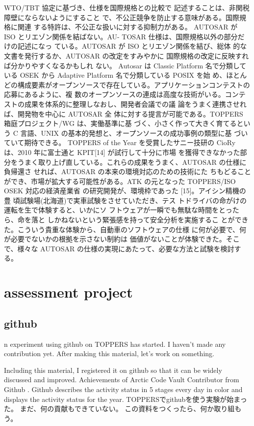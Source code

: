 \documentclass[twocolumn]{article} %
\begin{document}
WTO/TBT 協定に基づき、仕様を国際規格との比較で 記述することは、非関税障壁にならないようにすること で、不公正競争を防止する意味がある。国際規格に関連 する特許は、不公正な扱いに対する抑制力がある。
AUTOSAR が ISO とリエゾン関係を結ばない。AU- TOSAR 仕様は、国際規格以外の部分だけの記述になっ ている。AUTOSAR が ISO とリエゾン関係を結び、総体 的な文書を発行するか、AUTOSAR の改定をすみやかに 国際規格の改定に反映すれば分かりやすくなるかもしれ ない。
Autosar は Classic Platform 名で分類している OSEK から Adaptive Platform 名で分類している POSIX を始 め、ほとんどの構成要素がオープンソースで存在している。アプリケーションコンテストの応募にあるように、複 数のオープンソースの連成は高度な技術がいる。コンテ ストの成果を体系的に整理しなおし、開発者会議での議 論をうまく連携させれば、開発物を中心に AUTOSAR 全 体に対する提言が可能である。TOPPERS 箱庭プロジェクト/WG は、実働基準に基 づく、小さく作って大きく育てるという C 言語、UNIX の基本的発想と、オープンソースの成功事例の類型に基 づいていて期待できる。
TOPPERS of the Year を受賞したサニー技研の CioRy は、2010 年に富士通と KPIT[14] が試行して十分に市場 を獲得できなかった部分をうまく取り上げ直している。これらの成果をうまく、AUTOSAR の仕様に負帰還さ せれば、AUTOSAR の本来の環境対応のための技術にた ちもどることができ、市場が拡大する可能性がある。ATK の元となった TOPPERS/ISO OSEK 対応の経済産業省 の研究開発が、環境枠であった [15]。アイシン精機の豊 頃試験場(北海道)で実車試験をさせていただき、テス トドライバの命がけの運転を生で体験すると、いかにソ フトウェアが一瞬でも無駄な時間をとったら、命を落と しかねないという緊張感を持って安全分析を実施するこ とができた。こういう貴重な体験から、自動車のソフトウェアの仕様 に何が必要で、何が必要でないかの根拠を示さない制約は 価値がないことが体験できた。そこで、様々な AUTOSAR の仕様の実現にあたって、必要な方法と試験を検討する。


\section{assessment project}
\subsection{github}
n experiment using github on TOPPERS has started.
I haven't made any contribution yet.
After making this material, let's work on something.

Including this material, I registered it on github so that it can be widely discussed and improved.
Achievements of Arctic Code Vault Contributor from Github \cite{githubachieve}.
Github describes the activity status in 5 stages every day in color and displays the activity status for the year. \cite{gap2021}
TOPPERSでgithubを使う実験が始まった。
まだ、何の貢献もできていない。
この資料をつくったら、何か取り組もう。
\end{document}
